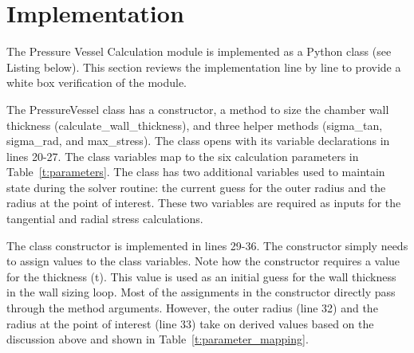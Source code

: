 \documentclass{article}
\begin{document}
\section{Implementation}
The Pressure Vessel Calculation module is implemented as a Python class (see Listing below).  This section reviews the implementation line by line to provide a white box verification of the module.  

The PressureVessel class has a constructor, a method to size the chamber wall thickness (calculate\_wall\_thickness), and three helper methods (sigma\_tan, sigma\_rad, and max\_stress).  The class opens with its variable declarations in lines 20-27.  The class variables map to the six calculation parameters in Table~\ref{t:parameters}.  The class has two additional variables used to maintain state during the solver routine: the current guess for the outer radius and the radius at the point of interest.  These two variables are required as inputs for the tangential and radial stress calculations.  

The class constructor is implemented in lines 29-36.  The constructor simply needs to assign values to the class variables.  Note how the constructor requires a value for the thickness (t).  This value is used as an initial guess for the wall thickness in the wall sizing loop.  Most of the assignments in the constructor directly pass through the method arguments.  However, the outer radius (line 32) and the radius at the point of interest (line 33) take on derived values based on the discussion above and shown in Table~\ref{t:parameter_mapping}.

\inputminted[linenos,frame=lines,framesep=2.0\fboxsep]{python}{pressure_vessel_calcs.py}
\end{document}
